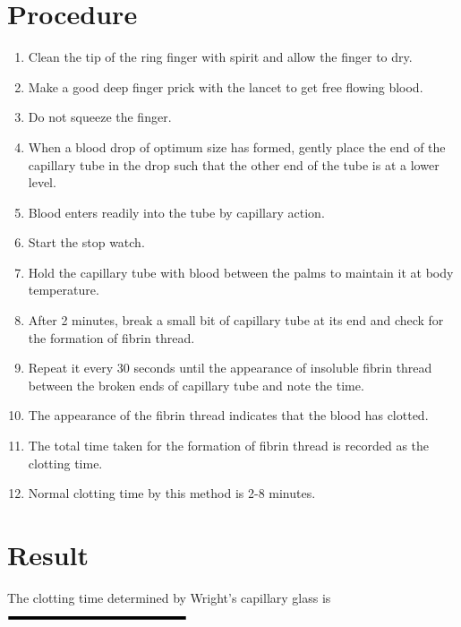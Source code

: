 \documentclass[a4paper,12pt]{book}
\begin{document}
											\section*{Procedure}
											\begin{enumerate}
												\item{Clean the tip of the ring finger with spirit and allow the finger to dry.}
												\item{Make a good deep finger prick with the lancet to get free flowing blood.}
												\item{Do not squeeze the finger.}
												\item{When a blood drop of optimum size has formed, gently place the end of the capillary tube in the drop such that the other end of the tube is at a lower level.}
												\item{Blood enters readily into the tube by capillary action.}
												\item{Start the stop watch.}
												\item{Hold the capillary tube with blood between the palms to maintain it at body temperature.}
												\item{After 2 minutes, break a small bit of capillary tube at its end and check for the formation of fibrin thread.}
												\item{Repeat it every 30 seconds until the appearance of insoluble fibrin thread between the broken ends of capillary tube and note the time.}
												\item{The appearance of the fibrin thread indicates that the blood has clotted.}
												\item{The total time taken for the formation of fibrin thread is recorded as the clotting time.}
												\item{Normal clotting time by this method is 2-8 minutes.}
											\end{enumerate}
											\section*{Result}

											The clotting time determined by Wright's capillary glass is $\rule{5cm}{0.1cm}$
\end{document}
